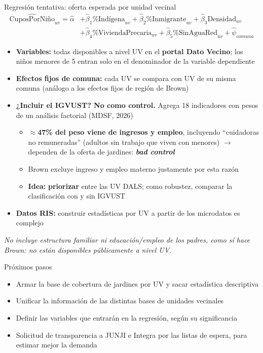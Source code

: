 \documentclass[aspectratio=169,10pt]{beamer}
\newcommand{\destacar}[1]{\textcolor{steel}{\textbf{#1}}}
\begin{document}
\begin{frame}{Regresión tentativa: oferta esperada por unidad vecinal}
  \footnotesize
  \[
    \begin{aligned}
      \widehat{\text{CuposPorNiño}}_{uv} = \hat\alpha &+ \hat\beta_1 \%\text{Indígena}_{uv} + \hat\beta_2 \%\text{Inmigrante}_{uv} + \hat\beta_3 \text{Densidad}_{uv} \\
      &+ \hat\beta_4 \%\text{ViviendaPrecaria}_{uv} + \hat\beta_5 \%\text{SinAguaRed}_{uv} + \hat\psi_{comuna}
    \end{aligned}
  \]
  \begin{itemize}[itemsep=2pt,topsep=0pt]
    \item \textbf{Variables:} todas disponibles a nivel UV en el \destacar{portal Dato Vecino}; los niños menores de 5 entran solo en el denominador de la variable dependiente
    \item \textbf{Efectos fijos de comuna:} cada UV se compara con UV de su misma comuna (análogo a los efectos fijos de región de Brown)
    \item \textbf{¿Incluir el IGVUST? No como control.} Agrega 18 indicadores con pesos de un análisis factorial (MDSF, 2026)
      \begin{itemize}[itemsep=1pt,topsep=1pt]
        \item $\approx$\destacar{47\% del peso viene de ingresos y empleo}, incluyendo ``cuidadoras no remuneradas'' (adultos sin trabajo que viven con menores) $\to$ dependen de la oferta de jardines: \destacar{\textit{bad control}}
        \item Brown excluye ingreso y empleo materno justamente por esta razón
        \item \textbf{Idea:} \destacar{priorizar} entre las UV DALS; como robustez, comparar la clasificación con y sin IGVUST
      \end{itemize}
    \item \textbf{Datos RIS:} construir estadísticas por UV a partir de los microdatos es complejo
  \end{itemize}
  \vfill
  {\scriptsize\color{graytext}\textit{No incluye estructura familiar ni educación/empleo de los padres, como sí hace Brown: no están disponibles públicamente a nivel UV.}}
\end{frame}

\begin{frame}{Próximos pasos}
  \begin{itemize}
    \item Armar la base de cobertura de jardines por UV y sacar estadística descriptiva
    \item Unificar la información de las distintas bases de unidades vecinales
    \item Definir las variables que entrarán en la regresión, según su significancia
    \item Solicitud de transparencia a JUNJI e Integra por las listas de espera, para estimar mejor la demanda
  \end{itemize}
\end{frame}
\end{document}
